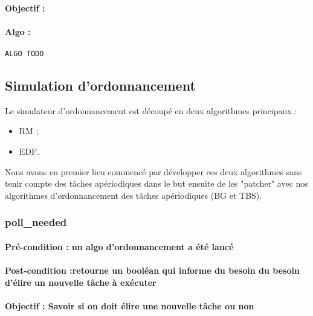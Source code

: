 				\paragraph{Objectif :} 
				\paragraph{Algo :} 
					\begin{lstlisting}
ALGO TODO
					\end{lstlisting}
	
		\subsection{Simulation d'ordonnancement}
			Le simulateur d'ordonnancement est découpé en deux algorithmes principaux :
			\begin{itemize}
				\item RM ;
				\item EDF.
			\end{itemize}
			
			Nous avons en premier lieu commencé par développer ces deux algorithmes sans tenir compte des tâches apériodiques dans le but ensuite de les "patcher" avec nos algorithmes d'ordonnancement des tâches apériodiques (BG et TBS).
			
			
			\subsubsection{poll\_needed}
				\paragraph{Pré-condition : un algo d'ordonnancement a été lancé} 
				\paragraph{Post-condition :retourne un booléan qui informe du besoin du besoin d'élire un nouvelle tâche à exécuter} 
				\paragraph{Objectif : Savoir si on doit élire une nouvelle tâche ou non} 
